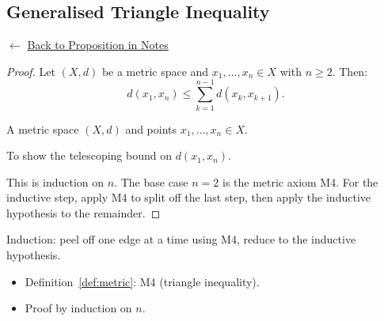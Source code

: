 
\subsection*{Generalised Triangle Inequality}
\label{prf:generalised-triangle}

\begin{remark*}[Return]
$\leftarrow$ \hyperref[prop:generalised-triangle]{Back to Proposition in Notes}
\end{remark*}

\begin{proof}
\Claim Let $(X,d)$ be a metric space and $x_1, \ldots, x_n \in X$ with $n \ge 2$.
Then:
\[
d(x_1, x_n) \le \sum_{k=1}^{n-1} d(x_k, x_{k+1}).
\]

\Given A metric space $(X,d)$ and points $x_1, \ldots, x_n \in X$.

\Goal To show the telescoping bound on $d(x_1, x_n)$.

\Strategy This is induction on $n$. The base case $n=2$ is the metric axiom M4.
For the inductive step, apply M4 to split off the last step, then apply
the inductive hypothesis to the remainder.


\end{proof}

\begin{remark*}
Induction: peel off one edge at a time using M4, reduce to the inductive hypothesis.
\end{remark*}

\begin{remark*}[Dependencies]
\begin{itemize}
  \item Definition~\ref{def:metric}: M4 (triangle inequality).
  \item Proof by induction on $n$.
\end{itemize}
\end{remark*}
